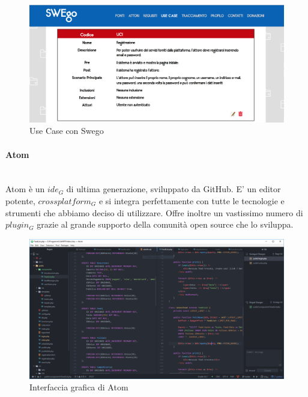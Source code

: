 	\begin{figure}[h]
	\label{figuraSwego}
	\centering 
	\includegraphics[width=1\textwidth]{images/swego2.png}
	\caption{Use Case con Swego} %
	\end{figure}


	
	\paragraph{Atom}
	\label{sec:Atom}
	\mbox{}\\
	Atom è un $ide_G$ di ultima generazione, sviluppato da GitHub. E' un editor potente,
	$cross platform_G$ e si integra perfettamente con tutte le tecnologie e strumenti che abbiamo deciso di utilizzare.
	Offre inoltre un vastissimo numero di $plugin_G$ grazie al grande supporto della comunità open source che lo sviluppa.
	
	\begin{figure}[H]
		\label{Atom}
		\centering 
		\includegraphics[width=1\textwidth]{images/atom.png}
		\caption{Interfaccia grafica di Atom} %
	\end{figure}
	
			
